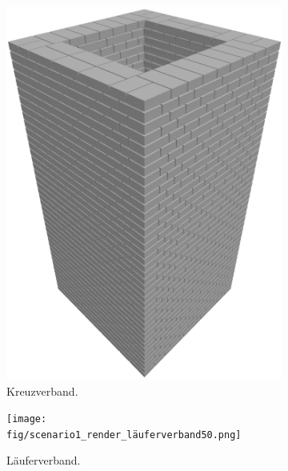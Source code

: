 \begin{figure}[htb]
    \begin{subfigure}[b]{0.3\columnwidth}
      \includegraphics[width=\columnwidth]{fig/scenario1_render_crossbond.png}
      \caption{Kreuzverband.}\label{fig:poc:render_crossbond}
    \end{subfigure}
    \hfill
    \begin{subfigure}[b]{0.3\columnwidth}
      \texttt{[image: fig/scenario1\_render\_läuferverband50.png]}
      \caption{Läuferverband.}\label{fig:poc:render_laeuferverband50}
    \end{subfigure}
    \hfill
    \begin{subfigure}[b]{0.3\columnwidth}

\end{subfigure}
\end{figure}

